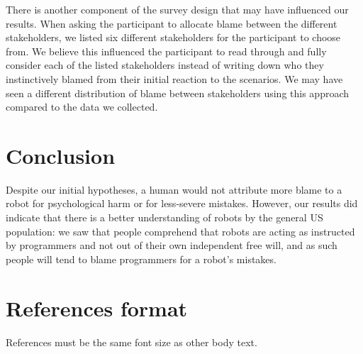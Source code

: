 \documentclass{sigchi}
\begin{document}
There is another component of the survey design that may have influenced our results. When asking the participant to allocate blame between the different stakeholders, we listed six different stakeholders for the participant to choose from. We believe this influenced the participant to read through and fully consider each of the listed stakeholders instead of writing down who they instinctively blamed from their initial reaction to the scenarios. We may have seen a different distribution of blame between stakeholders using this approach compared to the data we collected.

\section{Conclusion}
Despite our initial hypotheses, a human would not attribute more blame to a robot for psychological harm or for less-severe mistakes. However, our results did indicate that there is a better understanding of robots by the general US population: we saw that people comprehend that robots are acting as instructed by programmers and not out of their own independent free will, and as such people will tend to blame programmers for a robot's mistakes.

\section{References format}
References must be the same font size as other body text.


\end{document}
